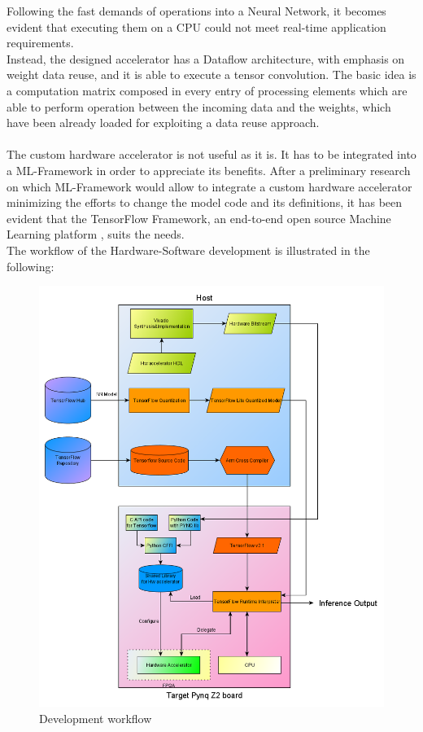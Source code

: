 Following the fast demands of operations into a Neural Network, it becomes evident that executing them on a CPU could not meet real-time application requirements.\\
Instead, the designed accelerator has a Dataflow architecture, with emphasis on weight data reuse, and it is able to execute a tensor convolution. The basic idea is a computation matrix composed in every entry of processing elements which are able to perform operation between the incoming data and the weights, which have been already loaded for exploiting a data reuse approach.\\\\
The custom hardware accelerator is not useful as it is. It has to be integrated into a ML-Framework in order to appreciate its benefits. After a preliminary research on which ML-Framework would allow to integrate a custom hardware accelerator minimizing the efforts to change the model code and its definitions, it has been evident that the TensorFlow Framework, an end-to-end open source Machine Learning platform \cite{WEBSITE:4}, suits the needs.\\
\newpage
The workflow of the Hardware-Software development is illustrated in the following:
\begin{figure}[!htbp]
\centering
\captionsetup{justification=centering}
\includegraphics[scale=0.5]{./figure/workflow.png}
\caption{Development workflow}
\label{fig:workflow}
\end{figure}

